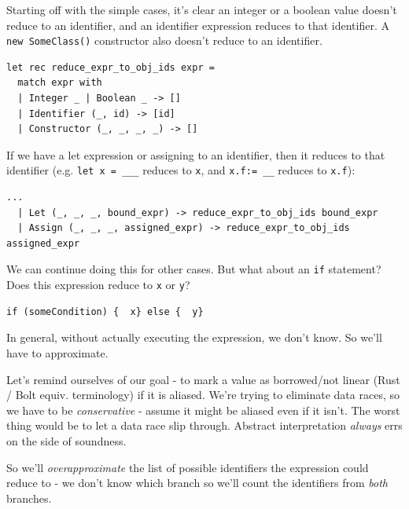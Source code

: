 Starting off with the simple cases, it's clear an integer or a boolean
value doesn't reduce to an identifier, and an identifier expression
reduces to that identifier. A \texttt{new\ SomeClass()} constructor also
doesn't reduce to an identifier.

%

\begin{lstlisting}[language=caml,caption={data\_race\_checker\_env.ml}]
let rec reduce_expr_to_obj_ids expr =
  match expr with
  | Integer _ | Boolean _ -> []
  | Identifier (_, id) -> [id]
  | Constructor (_, _, _, _) -> []
\end{lstlisting}

If we have a let expression or assigning to an identifier, then it
reduces to that identifier (e.g. \texttt{let\ x\ =\ \_\_\_} reduces to
\texttt{x}, and \texttt{x.f:=\ \_\_} reduces to \texttt{x.f}):

%

\begin{lstlisting}[language=caml]
...  
  | Let (_, _, _, bound_expr) -> reduce_expr_to_obj_ids bound_expr
  | Assign (_, _, _, assigned_expr) -> reduce_expr_to_obj_ids assigned_expr
\end{lstlisting}

We can continue doing this for other cases. But what about an
\texttt{if} statement? Does this expression reduce to \texttt{x} or
\texttt{y}?


\begin{verbatim}
if (someCondition) {  x} else {  y}
\end{verbatim}

In general, without actually executing the expression, we don't know. So
we'll have to approximate.

Let's remind ourselves of our goal - to mark a value as borrowed/not
linear (Rust / Bolt equiv. terminology) if it is aliased. We're trying
to eliminate data races, so we have to be \emph{conservative} - assume
it might be aliased even if it isn't. The worst thing would be to let a
data race slip through. Abstract interpretation \emph{always} errs on
the side of soundness.

So we'll \emph{overapproximate} the list of possible identifiers the
expression could reduce to - we don't know which branch so we'll count
the identifiers from \emph{both} branches.

